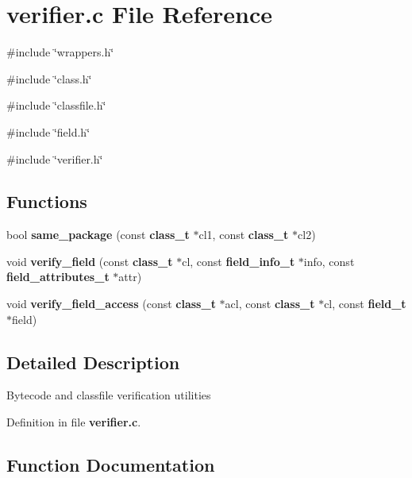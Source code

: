 \section{verifier.c File Reference}
\label{verifier_8c}
{\ttfamily \#include \char`\"{}wrappers.h\char`\"{}}\par
{\ttfamily \#include \char`\"{}class.h\char`\"{}}\par
{\ttfamily \#include \char`\"{}classfile.h\char`\"{}}\par
{\ttfamily \#include \char`\"{}field.h\char`\"{}}\par
{\ttfamily \#include \char`\"{}verifier.h\char`\"{}}\par
\subsection*{Functions}
\begin{DoxyCompactItemize}
\item 
bool {\bf same\_\-package} (const {\bf class\_\-t} $\ast$cl1, const {\bf class\_\-t} $\ast$cl2)
\item 
void {\bf verify\_\-field} (const {\bf class\_\-t} $\ast$cl, const {\bf field\_\-info\_\-t} $\ast$info, const {\bf field\_\-attributes\_\-t} $\ast$attr)
\item 
void {\bf verify\_\-field\_\-access} (const {\bf class\_\-t} $\ast$acl, const {\bf class\_\-t} $\ast$cl, const {\bf field\_\-t} $\ast$field)
\end{DoxyCompactItemize}


\subsection{Detailed Description}
Bytecode and classfile verification utilities 

Definition in file {\bf verifier.c}.



\subsection{Function Documentation}
